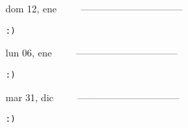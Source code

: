 \documentclass[letterpaper,10pt]{article}
\begin{document}
\begin{multicols}{3}
{dom 12, ene\ \ \ \ \ --------------------------------}
\begin{flushright}\begin{small}\texttt{:)}\end{small}\end{flushright}
\vfill
{lun 06, ene\ \ \ \ \ --------------------------------}
\begin{flushright}\begin{small}\texttt{:)}\end{small}\end{flushright}\par
\vfill
{mar 31, dic\ \ \ \ \ --------------------------------}
\begin{flushright}\begin{small}\texttt{:)}\end{small}\end{flushright}\par
\vfill
\end{multicols}
\vspace{1.05cm}
\end{document}
